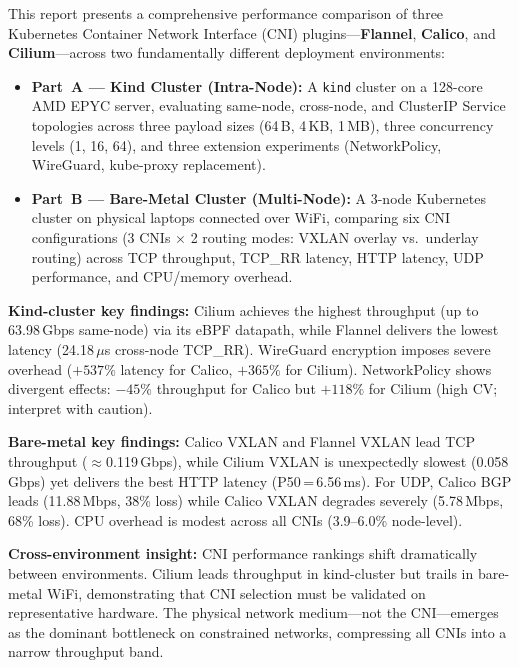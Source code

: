 \documentclass[11pt,a4paper]{article}
\begin{document}
This report presents a comprehensive performance comparison of three Kubernetes Container Network Interface (CNI) plugins---\textbf{Flannel}, \textbf{Calico}, and \textbf{Cilium}---across two fundamentally different deployment environments:
\begin{itemize}[nosep]
  \item \textbf{Part~A --- Kind Cluster (Intra-Node):} A \texttt{kind} cluster on a 128-core AMD EPYC server, evaluating same-node, cross-node, and ClusterIP Service topologies across three payload sizes (64\,B, 4\,KB, 1\,MB), three concurrency levels (1, 16, 64), and three extension experiments (NetworkPolicy, WireGuard, kube-proxy replacement).
  \item \textbf{Part~B --- Bare-Metal Cluster (Multi-Node):} A 3-node Kubernetes cluster on physical laptops connected over WiFi, comparing six CNI configurations (3 CNIs $\times$ 2 routing modes: VXLAN overlay vs.\ underlay routing) across TCP throughput, TCP\_RR latency, HTTP latency, UDP performance, and CPU/memory overhead.
\end{itemize}

\noindent\textbf{Kind-cluster key findings:} Cilium achieves the highest throughput (up to 63.98\,Gbps same-node) via its eBPF datapath, while Flannel delivers the lowest latency (24.18\,$\mu$s cross-node TCP\_RR). WireGuard encryption imposes severe overhead ($+537\%$ latency for Calico, $+365\%$ for Cilium). NetworkPolicy shows divergent effects: $-45\%$ throughput for Calico but $+118\%$ for Cilium (high CV; interpret with caution).

\noindent\textbf{Bare-metal key findings:} Calico VXLAN and Flannel VXLAN lead TCP throughput ($\approx$0.119\,Gbps), while Cilium VXLAN is unexpectedly slowest (0.058\,Gbps) yet delivers the best HTTP latency (P50\,=\,6.56\,ms). For UDP, Calico BGP leads (11.88\,Mbps, 38\% loss) while Calico VXLAN degrades severely (5.78\,Mbps, 68\% loss). CPU overhead is modest across all CNIs (3.9--6.0\% node-level).

\noindent\textbf{Cross-environment insight:} CNI performance rankings shift dramatically between environments. Cilium leads throughput in kind-cluster but trails in bare-metal WiFi, demonstrating that CNI selection must be validated on representative hardware. The physical network medium---not the CNI---emerges as the dominant bottleneck on constrained networks, compressing all CNIs into a narrow throughput band.

\end{document}
